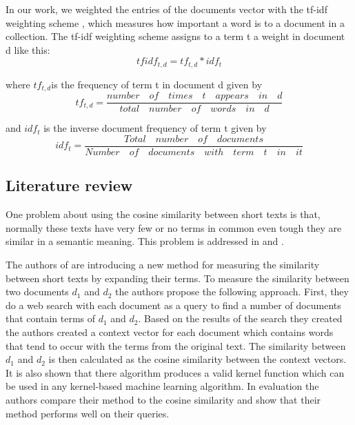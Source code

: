 In our work, we weighted the entries of the documents vector with the tf-idf weighting scheme  , which measures  how important  a word is to a document in a collection. The tf-idf weighting scheme assigns to a term t a weight in document d like  this:
\begin{equation}
tfidf_{t,d} = tf_{t,d} * idf_{t} 
\end{equation}

where $tf_{t,d}$is the  frequency of term t in document d given by
\begin{equation}
tf_{t,d} = \dfrac{number \quad  of \quad  times \quad   t \quad  appears \quad  in \quad   d}{total \quad number  \quad  of \quad  words \quad  in \quad  d}
\end{equation}

and $idf_{t}$ is the inverse document frequency of term t given by
\begin{equation}
idf_{t} = \dfrac{Total \quad number \quad  of  \quad documents}{Number \quad  of \quad  documents \quad  with \quad  term \quad t \quad  in  \quad it}
\end{equation}

\subsection{Literature review}


One problem about using the cosine similarity between short texts is that, normally these texts have very few  or no terms in common even tough they are similar in a semantic meaning. This problem is addressed in \cite{Sahami:2006:WKF:1135777.1135834} and \cite{Yih:2007:ISM:1619797.1619884}.

The authors of \cite{Sahami:2006:WKF:1135777.1135834} are introducing a new method for measuring the similarity between short texts by expanding their terms. To measure the similarity between two documents $d_1$ and $d_2$ the authors propose the following approach. First, they do a web search with each document as a query to find a number of documents that contain terms of $d_1$ and $d_2$. Based on the results of the search they created the authors created  a context vector for each document which contains words that tend to occur with the terms from the original text. The similarity between $d_1$ and $d_2$ is then calculated as the cosine similarity between the context vectors. It is also shown that there algorithm produces a valid kernel function which can be used in any kernel-based machine learning algorithm. In evaluation the authors compare their method to the cosine similarity and show that their method performs well on their queries. 


